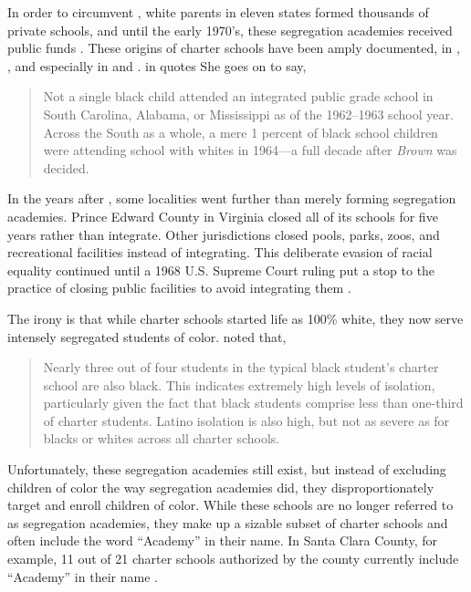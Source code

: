 In order to circumvent , white parents in eleven states formed thousands of private schools, and until the early 1970's, these segregation academies received public funds \parencite[81]{Rooks2017}. These origins of  charter schools have been amply documented, in \textcite{Frankenberg.etal2010}, \textcite{Frankenberg.etal2011}, and especially in \textcite{Suitts2019} and \textcite{Suitts2020}. \citeauthor{Alexander2011} in  quotes \textcite[52]{Rosenberg1991}  She goes on to say,
\blockquote[{\parencite[235]{Alexander2011}}][]{\SingleSpacing\vspace{-0.5\baselineskip}%
Not a single black child attended an integrated public grade school in South Carolina, Alabama, or Mississippi as of the 1962–1963 school year. Across the South as a whole, a mere 1 percent of black school children were attending school with whites in 1964—a full decade after \textit{Brown} was decided.}

In the years after , some localities went further than merely forming segregation academies. Prince Edward County in Virginia closed all of its schools for five years rather than integrate. Other jurisdictions closed pools, parks, zoos, and recreational facilities instead of integrating. This deliberate evasion of racial equality continued until a 1968 U.S. Supreme Court ruling put a stop to the practice of closing public facilities to avoid integrating them \parencite{Brennan1968}.

The irony is that while charter schools started life as 100\% white, they now serve intensely segregated students of color. \textcite[47]{Frankenberg.etal2019} noted that,
\blockquote[][]{\SingleSpacing\vspace{-0.5\baselineskip}%
Nearly three out of four students in the typical black student's charter school are also black. This indicates extremely high levels of isolation, particularly given the fact that black students comprise less than one-third of charter students. Latino isolation is also high, but not as severe as for blacks or whites across all charter schools.}

Unfortunately, these segregation academies still exist, but instead of excluding children of color the way segregation academies did, they disproportionately target and enroll children of color. While these schools are no longer referred to as segregation academies, they make up a sizable subset of charter schools and often include the word ``Academy'' in their name. In Santa Clara County, for example, 11 out of 21 charter schools authorized by the county currently include ``Academy'' in their name \parencite{SCCOE2023}.

